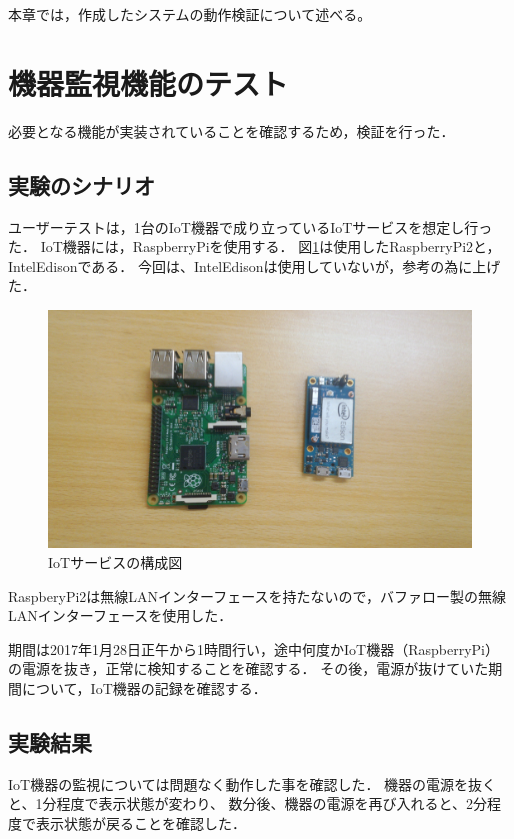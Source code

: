 本章では，作成したシステムの動作検証について述べる。

\section{機器監視機能のテスト}
必要となる機能が実装されていることを確認するため，検証を行った．

\subsection{実験のシナリオ}
ユーザーテストは，1台のIoT機器で成り立っているIoTサービスを想定し行った．
IoT機器には，RaspberryPiを使用する．
図\ref{fig:device}は使用したRaspberryPi2と，IntelEdisonである．
今回は、IntelEdisonは使用していないが，参考の為に上げた．
\begin{figure}[htbp]
\includegraphics[width=14cm]{images/device.png}
\caption{IoTサービスの構成図}
\label{fig:device}
\end{figure}

RaspberyPi2は無線LANインターフェースを持たないので，バファロー製の無線LANインターフェースを使用した．

期間は2017年1月28日正午から1時間行い，途中何度かIoT機器（RaspberryPi）の電源を抜き，正常に検知することを確認する．
その後，電源が抜けていた期間について，IoT機器の記録を確認する．

\subsection{実験結果}
IoT機器の監視については問題なく動作した事を確認した．
機器の電源を抜くと、1分程度で表示状態が変わり、
数分後、機器の電源を再び入れると、2分程度で表示状態が戻ることを確認した．

